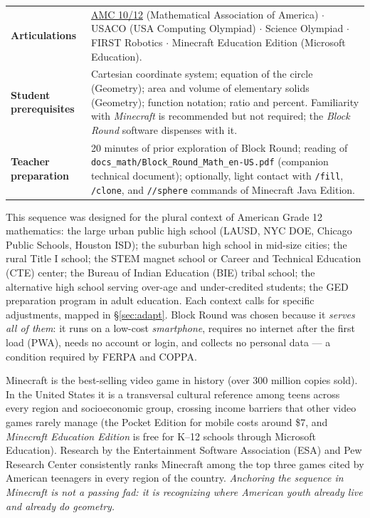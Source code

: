 \documentclass[12pt,a4paper]{scrartcl}
\newcommand{\cmd}[1]{\textcolor{earth}{\texttt{\small #1}}}
\begin{document}
\begin{center}
\begin{tabular}{@{}p{}p{}@{}}
\addlinespace[2pt]
\textbf{Articulations} & \hyperref[sec:olympiad]{AMC 10/12} (Mathematical Association of America) $\cdot$ USACO (USA Computing Olympiad) $\cdot$ Science Olympiad $\cdot$ FIRST Robotics $\cdot$ Minecraft Education Edition (Microsoft Education). \\
\addlinespace[2pt]
\textbf{Student prerequisites} & Cartesian coordinate system; equation of the circle (Geometry); area and volume of elementary solids (Geometry); function notation; ratio and percent. Familiarity with \emph{Minecraft} is recommended but not required; the \emph{Block Round} software dispenses with it. \\
\addlinespace[2pt]
\textbf{Teacher preparation} & 20 minutes of prior exploration of Block Round; reading of \texttt{docs\_math/Block\_Round\_Math\_en-US.pdf} (companion technical document); optionally, light contact with \cmd{/fill}, \cmd{/clone}, and \cmd{//sphere} commands of Minecraft Java Edition. \\
\bottomrule
\end{tabular}
\end{center}

\begin{note}
This sequence was designed for the plural context of American Grade 12 mathematics: the large urban public high school (LAUSD, NYC DOE, Chicago Public Schools, Houston ISD); the suburban high school in mid-size cities; the rural Title I school; the STEM magnet school or Career and Technical Education (CTE) center; the Bureau of Indian Education (BIE) tribal school; the alternative high school serving over-age and under-credited students; the GED preparation program in adult education. Each context calls for specific adjustments, mapped in §\ref{sec:adapt}. Block Round was chosen because it \emph{serves all of them}: it runs on a low-cost \emph{smartphone}, requires no internet after the first load (PWA), needs no account or login, and collects no personal data --- a condition required by FERPA and COPPA.
\end{note}

\begin{minecraft}
Minecraft is the best-selling video game in history (over 300 million copies sold). In the United States it is a transversal cultural reference among teens across every region and socioeconomic group, crossing income barriers that other video games rarely manage (the Pocket Edition for mobile costs around \$7, and \emph{Minecraft Education Edition} is free for K--12 schools through Microsoft Education). Research by the Entertainment Software Association (ESA) and Pew Research Center consistently ranks Minecraft among the top three games cited by American teenagers in every region of the country. \emph{Anchoring the sequence in Minecraft is not a passing fad: it is recognizing where American youth already live and already do geometry.}
\end{minecraft}
\end{document}
